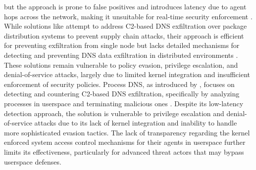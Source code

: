 \documentclass [11pt, proquest] {uwthesis}[2020/02/24]
\begin{document}
but the approach is prone to false positives and introduces latency due to agent hops across the network, making it unsuitable for real-time security enforcement \cite{9486400}. While solutions like \citeauthor{haider2024c2}  attempt to address C2-based DNS exfiltration over package distribution systems to prevent supply chain attacks, their approach is efficient for preventing exfiltration from single node but lacks detailed mechanisms for detecting and preventing DNS data exfiltration in distributed environments \cite{haider2024c2,sivakorn2019countering}. These solutions remain vulnerable to policy evasion, privilege escalation, and denial-of-service attacks, largely due to limited kernel integration and insufficient enforcement of security policies. Process DNS, as introduced by \citeauthor{sivakorn2019countering}, focuses on detecting and countering C2-based DNS exfiltration, specifically by analyzing processes in userspace and terminating malicious ones \cite{sivakorn2019countering}. Despite its low-latency detection approach, the solution is vulnerable to privilege escalation and denial-of-service attacks due to its lack of kernel integration and inability to handle more sophisticated evasion tactics. The lack of transparency regarding the kernel enforced system access control mechanisms for their agents in userspace further limits its effectiveness, particularly for advanced threat actors that may bypass userspace defenses.
\end{document}
